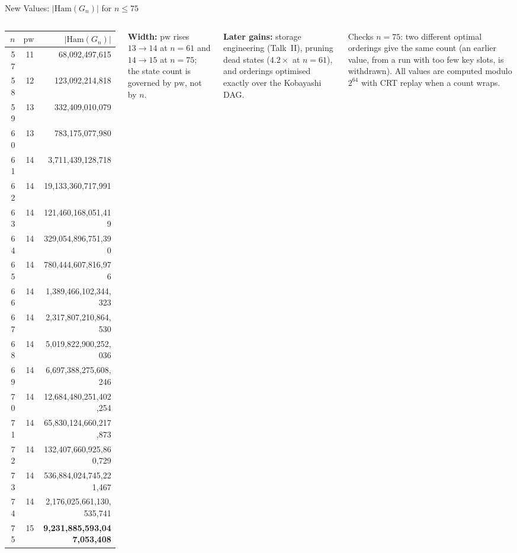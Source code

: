 \documentclass[aspectratio=169,t]{beamer}
\newcommand{\pw}{\mathrm{pw}}
\begin{document}
\begin{frame}{New Values: $|\mathrm{Ham}(G_n)|$ for $n\le 75$}
\footnotesize
\begin{columns}[t]
\centering
{\scriptsize
\renewcommand{\arraystretch}{0.9}
\begin{tabular}[t]{rrr}
\toprule
$n$ & $\pw$ & $|\mathrm{Ham}(G_n)|$ \\
\midrule
57 & 11 & 68{,}092{,}497{,}615 \\
58 & 12 & 123{,}092{,}214{,}818 \\
59 & 13 & 332{,}409{,}010{,}079 \\
60 & 13 & 783{,}175{,}077{,}980 \\
61 & 14 & 3{,}711{,}439{,}128{,}718 \\
62 & 14 & 19{,}133{,}360{,}717{,}991 \\
63 & 14 & 121{,}460{,}168{,}051{,}419 \\
64 & 14 & 329{,}054{,}896{,}751{,}390 \\
65 & 14 & 780{,}444{,}607{,}816{,}976 \\
66 & 14 & 1{,}389{,}466{,}102{,}344{,}323 \\
67 & 14 & 2{,}317{,}807{,}210{,}864{,}530 \\
68 & 14 & 5{,}019{,}822{,}900{,}252{,}036 \\
69 & 14 & 6{,}697{,}388{,}275{,}608{,}246 \\
70 & 14 & 12{,}684{,}480{,}251{,}402{,}254 \\
71 & 14 & 65{,}830{,}124{,}660{,}217{,}873 \\
72 & 14 & 132{,}407{,}660{,}925{,}860{,}729 \\
73 & 14 & 536{,}884{,}024{,}745{,}221{,}467 \\
74 & 14 & 2{,}176{,}025{,}661{,}130{,}535{,}741 \\
\rowcolor{dkgreen!15}
75 & 15 & \textbf{9{,}231{,}885{,}593{,}047{,}053{,}408} \\
\bottomrule
\end{tabular}}

\textbf{Width:} $\pw$ rises $13\to14$ at $n=61$ and $14\to15$ at
$n=75$; the state count is governed by $\pw$, not by $n$.

\vspace{0.1cm}
\textbf{Later gains:} storage engineering (Talk~II), pruning dead
states ($4.2\times$ at $n=61$), and orderings optimised exactly over the
Kobayashi DAG.

\vspace{0.1cm}
\begin{block}{Checks}
{\scriptsize $n=75$: two different optimal orderings give the same count
(an earlier value, from a run with too few key slots, is withdrawn).
All values are computed modulo $2^{64}$ with CRT replay when a count wraps.}
\end{block}
\end{columns}
\end{frame}
\end{document}

